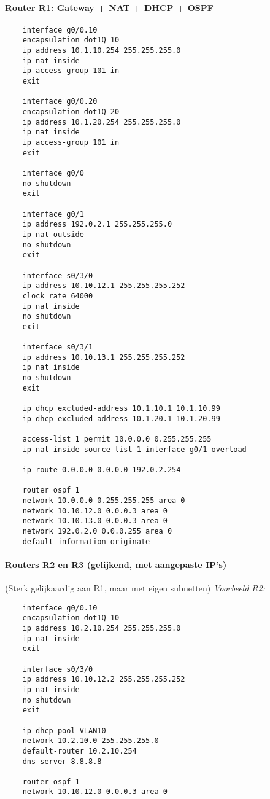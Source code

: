 \paragraph{Router R1: Gateway + NAT + DHCP + OSPF}
\begin{verbatim}
    interface g0/0.10
    encapsulation dot1Q 10
    ip address 10.1.10.254 255.255.255.0
    ip nat inside
    ip access-group 101 in
    exit
    
    interface g0/0.20
    encapsulation dot1Q 20
    ip address 10.1.20.254 255.255.255.0
    ip nat inside
    ip access-group 101 in
    exit
    
    interface g0/0
    no shutdown
    exit
    
    interface g0/1
    ip address 192.0.2.1 255.255.255.0
    ip nat outside
    no shutdown
    exit
    
    interface s0/3/0
    ip address 10.10.12.1 255.255.255.252
    clock rate 64000
    ip nat inside
    no shutdown
    exit
    
    interface s0/3/1
    ip address 10.10.13.1 255.255.255.252
    ip nat inside
    no shutdown
    exit
    
    ip dhcp excluded-address 10.1.10.1 10.1.10.99
    ip dhcp excluded-address 10.1.20.1 10.1.20.99
    
    access-list 1 permit 10.0.0.0 0.255.255.255
    ip nat inside source list 1 interface g0/1 overload
    
    ip route 0.0.0.0 0.0.0.0 192.0.2.254
    
    router ospf 1
    network 10.0.0.0 0.255.255.255 area 0
    network 10.10.12.0 0.0.0.3 area 0
    network 10.10.13.0 0.0.0.3 area 0
    network 192.0.2.0 0.0.0.255 area 0
    default-information originate
\end{verbatim}

\vspace{0.3cm}
\paragraph{Routers R2 en R3 (gelijkend, met aangepaste IP's)}
(Sterk gelijkaardig aan R1, maar met eigen subnetten)
\textit{Voorbeeld R2:}
\begin{verbatim}
    interface g0/0.10
    encapsulation dot1Q 10
    ip address 10.2.10.254 255.255.255.0
    ip nat inside
    exit
    
    interface s0/3/0
    ip address 10.10.12.2 255.255.255.252
    ip nat inside
    no shutdown
    exit
    
    ip dhcp pool VLAN10
    network 10.2.10.0 255.255.255.0
    default-router 10.2.10.254
    dns-server 8.8.8.8
    
    router ospf 1
    network 10.10.12.0 0.0.0.3 area 0
\end{verbatim}

